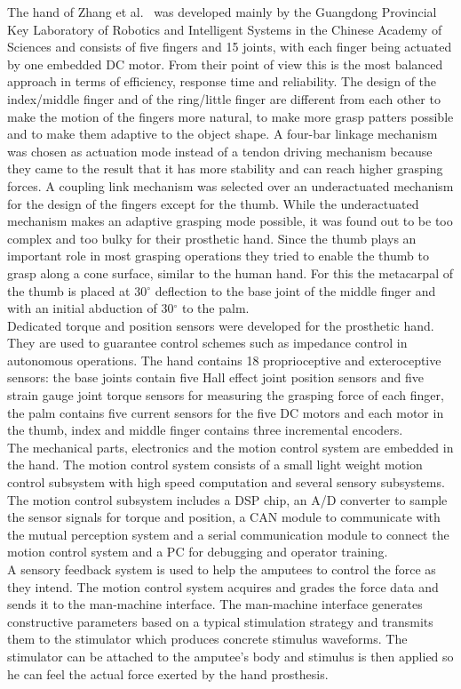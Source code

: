 \documentclass[a4paper, 10pt, conference]{ieeeconf}      %
\begin{document}
The hand of Zhang et al.~\cite{zhang} was developed mainly by the Guangdong Provincial Key Laboratory of Robotics and Intelligent Systems in the Chinese Academy of Sciences and consists of five fingers and 15 joints, with each finger being actuated by one embedded DC motor. From their point of view this is the most balanced approach in terms of efficiency, response time and reliability. The design of the index/middle finger and of the ring/little finger are different from each other to make the motion of the fingers more natural, to make more grasp patters possible and to make them adaptive to the object shape. A four-bar linkage mechanism was chosen as actuation mode instead of a tendon driving mechanism because they came to the result that it has more stability and can reach higher grasping forces. A coupling link mechanism was selected over an underactuated mechanism for the design of the fingers except for the thumb. While the underactuated mechanism makes an adaptive grasping mode possible, it was found out to be too complex and too bulky for their prosthetic hand. Since the thumb plays an important role in most grasping operations they tried to enable the thumb to grasp along a cone surface, similar to the human hand. For this the metacarpal of the thumb is placed at 30$^\circ$ deflection to the base joint of the middle finger and with an initial abduction of 30$^\circ$ to the palm.\\
Dedicated torque and position sensors were developed for the prosthetic hand. They are used to guarantee control schemes such as impedance control in autonomous operations. The hand contains 18 proprioceptive and exteroceptive sensors: the base joints contain five Hall effect joint position sensors and five strain gauge joint torque sensors for measuring the grasping force of each finger, the palm contains five current sensors for the five DC motors and each motor in the thumb, index and middle finger contains three incremental encoders.\\
The mechanical parts, electronics and the motion control system are embedded in the hand. The motion control system consists of a small light weight motion control subsystem with high speed computation and several sensory subsystems. The motion control subsystem includes a DSP chip, an A/D converter to sample the sensor signals for torque and position, a CAN module to communicate with the mutual perception system and a serial communication module to connect the motion control system and a PC for debugging and operator training.\\
A sensory feedback system is used to help the amputees to control the force as they intend. The motion control system acquires and grades the force data and sends it to the man-machine interface. The man-machine interface generates constructive parameters based on a typical stimulation strategy and transmits them to the stimulator which produces concrete stimulus waveforms. The stimulator can be attached to the amputee's body and stimulus is then applied so he can feel the actual force exerted by the hand prosthesis. 
\end{document}
